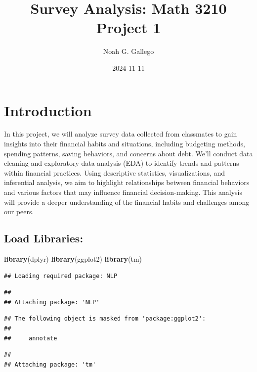 \documentclass[
]{article}
\title{Survey Analysis: Math 3210 Project 1}
\author{Noah G. Gallego}
\date{2024-11-11}
\newenvironment{Shaded}{\begin{snugshade}}{\end{snugshade}}
\newcommand{\FunctionTok}[1]{\textcolor[rgb]{0.13,0.29,0.53}{\textbf{#1}}}
\newcommand{\NormalTok}[1]{#1}
\begin{document}
\maketitle

{
\setcounter{tocdepth}{2}
\tableofcontents
}
\section{Introduction}\label{introduction}

In this project, we will analyze survey data collected from classmates
to gain insights into their financial habits and situations, including
budgeting methods, spending patterns, saving behaviors, and concerns
about debt. We'll conduct data cleaning and exploratory data analysis
(EDA) to identify trends and patterns within financial practices. Using
descriptive statistics, visualizations, and inferential analysis, we aim
to highlight relationships between financial behaviors and various
factors that may influence financial decision-making. This analysis will
provide a deeper understanding of the financial habits and challenges
among our peers.

\subsection{Load Libraries:}\label{load-libraries}

\begin{Shaded}
\begin{Highlighting}[]
\FunctionTok{library}\NormalTok{(dplyr)}
\FunctionTok{library}\NormalTok{(ggplot2)}
\FunctionTok{library}\NormalTok{(tm)}
\end{Highlighting}
\end{Shaded}

\begin{verbatim}
## Loading required package: NLP
\end{verbatim}

\begin{verbatim}
## 
## Attaching package: 'NLP'
\end{verbatim}

\begin{verbatim}
## The following object is masked from 'package:ggplot2':
## 
##     annotate
\end{verbatim}

\begin{verbatim}
## 
## Attaching package: 'tm'
\end{verbatim}
\end{document}
